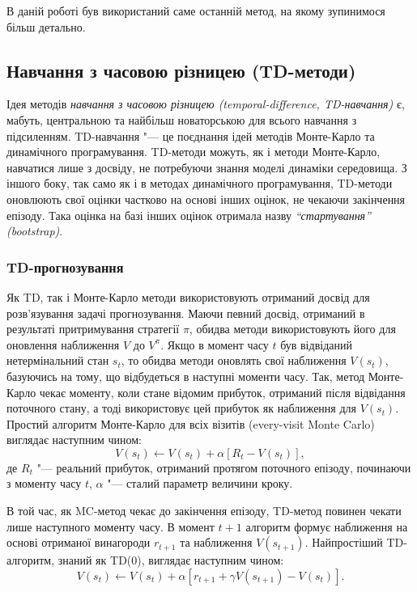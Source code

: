 В даній роботі був використаний саме останній метод, на якому зупинимося більш детально.

\subsection{Навчання з часовою різницею (TD-методи)}

Ідея методів \emph{навчання з часовою різницею (temporal-difference, TD-навчання)} є, мабуть, центральною та найбільш новаторською для всього навчання з підсиленням. TD-навчання "--- це поєднання ідей методів Монте-Карло та динамічного програмування. TD-методи можуть, як і методи Монте-Карло, навчатися лише з досвіду, не потребуючи знання моделі динаміки середовища. З іншого боку, так само як і в методах динамічного програмування, TD-методи оновлюють свої оцінки частково на основі інших оцінок, не чекаючи закінчення епізоду. Така оцінка на базі інших оцінок отримала назву \textit{``стартування'' (bootstrap)}.

\subsubsection{TD-прогнозування}

Як TD, так і Монте-Карло методи використовують отриманий досвід для розв'язування задачі прогнозування. Маючи певний досвід, отриманий в результаті притримування стратегії $\pi$, обидва методи використовують його для оновлення наближення $V$ до $V^\pi$. Якщо в момент часу $t$ був відвіданий нетермінальний стан $s_t$, то обидва методи оновлять свої наближення $V(s_t)$, базуючись на тому, що відбудеться в наступні моменти часу. Так, метод Монте-Карло чекає моменту, коли стане відомим прибуток, отриманий після відвідання поточного стану, а тоді використовує цей прибуток як наближення для $V(s_t)$. Простий алгоритм Монте-Карло для всіх візитів (every-visit Monte Carlo) виглядає наступним чином:
\begin{equation}
V(s_t) \leftarrow V(s_t) + \alpha\left[R_t - V(s_t)\right],
\end{equation}
де $R_t$ "--- реальний прибуток, отриманий протягом поточного епізоду, починаючи з моменту часу $t$, $\alpha$ "--- сталий параметр величини кроку.

В той час, як MC-метод чекає до закінчення епізоду, TD-метод повинен чекати лише наступного моменту часу. В момент $t+1$ алгоритм формує наближення на основі отриманої винагороди $r_{t+1}$ та наближення $V(s_{t+1})$. Найпростіший TD-алгоритм, знаний як TD(0), виглядає наступним чином:
\begin{equation}
V(s_t) \leftarrow V(s_t) + \alpha\left[r_{t+1} + \gamma V(s_{t+1}) - V(s_t)\right].
\end{equation}

